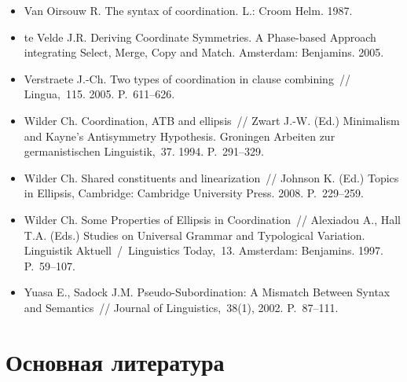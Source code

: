 \begin{itemize}
\item
  Van Oirsouw R. The syntax of coordination. L.: Croom Helm. 1987.
\item
  te Velde J.R. Deriving Coordinate Symmetries. A Phase-based Approach
  integrating Select, Merge, Copy and Match. Amsterdam: Benjamins. 2005.
\item
  Verstraete J.-Ch. Two types of coordination in clause combining~//
  Lingua,~115. 2005. P.~611--626.
\item
  Wilder Ch. Coordination, ATB and ellipsis~// Zwart J.-W. (Ed.)
  Minimalism and Kayne's Antisymmetry Hypothesis. Groningen Arbeiten zur
  germanistischen Linguistik,~37. 1994. P.~291--329.
\item
  Wilder Ch. Shared constituents and linearization~// Johnson K. (Ed.)
  Topics in Ellipsis, Cambridge: Cambridge University Press. 2008.
  P.~229--259.
\item
  Wilder Ch. Some Properties of Ellipsis in Coordination~// Alexiadou
  A., Hall T.A. (Eds.) Studies on Universal Grammar and Typological
  Variation. Linguistik Aktuell~/~Linguistics Today,~13. Amsterdam:
  Benjamins. 1997. P.~59--107.
\item
  Yuasa E., Sadock J.M. Pseudo-Subordination: A Mismatch Between Syntax
  and Semantics~// Journal of Linguistics,~38(1), 2002. P.~87--111.
\end{itemize}

\section*{Основная литература}\label{ux43eux441ux43dux43eux432ux43dux430ux44f-ux43bux438ux442ux435ux440ux430ux442ux443ux440ux430}

